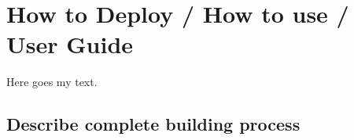 \section{How to Deploy / How to use / User Guide}

Here goes my text.

\subsection{Describe complete building process}